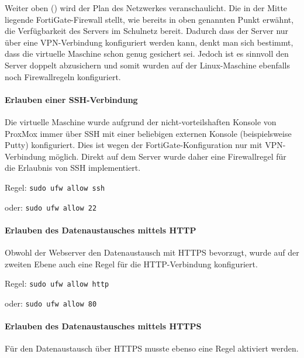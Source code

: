 Weiter oben () wird der Plan des
Netzwerkes veranschaulicht. Die in der Mitte liegende FortiGate-Firewall
stellt, wie bereits in oben genannten Punkt erwähnt, die Verfügbarkeit
des Servers im Schulnetz bereit. Dadurch dass der Server nur über eine
VPN-Verbindung konfiguriert werden kann, denkt man sich bestimmt, dass
die virtuelle Maschine schon genug gesichert sei. Jedoch ist es sinnvoll
den Server doppelt abzusichern und somit wurden auf der Linux-Maschine
ebenfalls noch Firewallregeln konfiguriert.

\hypertarget{erlauben-einer-ssh-verbindung}{%
\paragraph{Erlauben einer
SSH-Verbindung}\label{erlauben-einer-ssh-verbindung}}

Die virtuelle Maschine wurde aufgrund der nicht-vorteilshaften Konsole
von ProxMox immer über SSH mit einer beliebigen externen Konsole
(beispielsweise Putty) konfiguriert. Dies ist wegen der
FortiGate-Konfiguration nur mit VPN-Verbindung möglich. Direkt auf dem
Server wurde daher eine Firewallregel für die Erlaubnis von SSH
implementiert.

Regel: \texttt{sudo\ ufw\ allow\ ssh}

oder: \texttt{sudo\ ufw\ allow\ 22}

\hypertarget{erlauben-des-datenaustausches-mittels-http}{%
\paragraph{Erlauben des Datenaustausches mittels
HTTP}\label{erlauben-des-datenaustausches-mittels-http}}

Obwohl der Webserver den Datenaustausch mit HTTPS bevorzugt, wurde auf
der zweiten Ebene auch eine Regel für die HTTP-Verbindung konfiguriert.

Regel: \texttt{sudo\ ufw\ allow\ http}

oder: \texttt{sudo\ ufw\ allow\ 80}

\hypertarget{erlauben-des-datenaustausches-mittels-https}{%
\paragraph{Erlauben des Datenaustausches mittels
HTTPS}\label{erlauben-des-datenaustausches-mittels-https}}

Für den Datenaustausch über HTTPS musste ebenso eine Regel aktiviert
werden.

